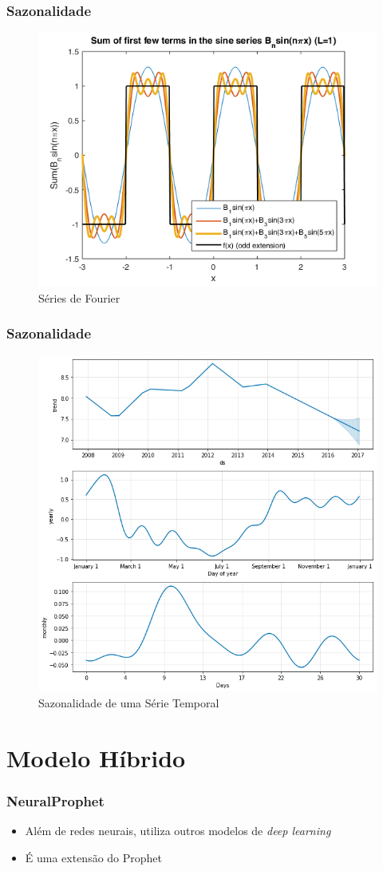 \documentclass{beamer}
\begin{document}
\begin{frame}
\frametitle{Sazonalidade}
\begin{figure}
    \centering
    \includegraphics[width=0.6\linewidth]{fourier.png}
    \caption{Séries de Fourier}
\end{figure}
\end{frame}


\begin{frame}
\frametitle{Sazonalidade}

\begin{figure}
    \centering
    \includegraphics[width=0.4\linewidth]{sazonalidade.png}
    \caption{Sazonalidade de uma Série Temporal}
\end{figure}
\end{frame}


\section{Modelo Híbrido}


\begin{frame}
\frametitle{NeuralProphet}
\begin{itemize}
    \item Além de redes neurais, utiliza outros modelos de \textit{deep learning}
    \item É uma extensão do Prophet
\end{itemize}
\end{frame}
\end{document}
